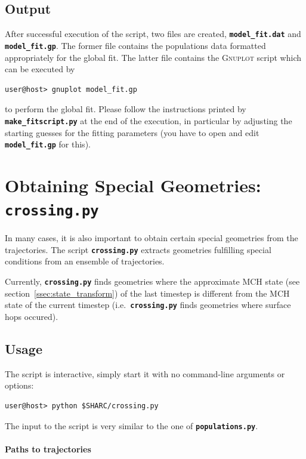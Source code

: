 \documentclass[a4paper,11pt,DIV=15,openany,twoside=false]{scrbook}
\newcommand{\ttt}[1]{\textbf{\texttt{#1}}}
\begin{document}
\subsection{Output}

After successful execution of the script, two files are created, \ttt{model\_fit.dat} and \ttt{model\_fit.gp}.
The former file contains the populations data formatted appropriately for the global fit.
The latter file contains the \textsc{Gnuplot} script which can be executed by
\begin{verbatim}
user@host> gnuplot model_fit.gp
\end{verbatim}
to perform the global fit.
Please follow the instructions printed by \ttt{make\_fitscript.py} at the end of the execution, in particular by adjusting the starting guesses for the fitting parameters (you have to open and edit \ttt{model\_fit.gp} for this).








\section{Obtaining Special Geometries: \ttt{crossing.py}}\label{sec:crossing.py}

In many cases, it is also important to obtain certain special geometries from the trajectories. The script \ttt{crossing.py} extracts geometries fulfilling special conditions from an ensemble of trajectories. 

Currently, \ttt{crossing.py} finds geometries where the approximate MCH state (see section~\ref{ssec:state_transform}) of the last timestep is different from the MCH state of the current timestep (i.e.\ \ttt{crossing.py} finds geometries where surface hops occured). 

\subsection{Usage}

The script is interactive, simply start it with no command-line arguments or options:
\begin{verbatim}
user@host> python $SHARC/crossing.py
\end{verbatim}

The input to the script is very similar to the one of \ttt{populations.py}. 

\paragraph{Paths to trajectories}
\end{document}
